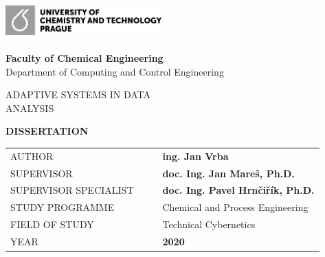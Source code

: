 \cleardoublepage
\thispagestyle{empty}
\thispagestyle{empty}
\noindent
\includegraphics[width=0.45\textwidth]{IMG/TOP/logoUCT_basic_CB.png} \\
\vspace{10mm}
\\
{\Large \textbf{Faculty of Chemical Engineering}
\\ [5mm]
Department of Computing and Control Engineering}

\vspace{40mm}

\begin{spacing}{0.9}
\Huge\noindent ADAPTIVE SYSTEMS IN DATA \\ANALYSIS\\
\end{spacing}

\vspace{30mm}

\noindent
{\Large \textbf{DISSERTATION}} 

\vspace{15mm}

\begin{table}[!h]
\begin{tabular}{  l l |l  l }
\hspace{-0.5em}AUTHOR & \hspace{0mm} & & {\Large \textbf{ing. Jan Vrba}} \\ [7mm]
\hspace{-0.5em}SUPERVISOR &  &  & \textbf{\large doc. Ing. Jan Mareš, Ph.D.}\\ [7mm]
\hspace{-0.5em}SUPERVISOR SPECIALIST    &     &   & {\textbf{\large doc. Ing. Pavel Hrnčiřík, Ph.D.}} \\ [7mm]
\hspace{-0.5em}STUDY PROGRAMME &  &  & {\large Chemical and Process Engineering} \\ [7mm]
\hspace{-0.5em}FIELD OF STUDY & &   & {\large Technical Cybernetics}\\ [7mm]
\hspace{-0.5em}YEAR          &       &   & \textbf{2020} \\
\end{tabular}


\end{table}

